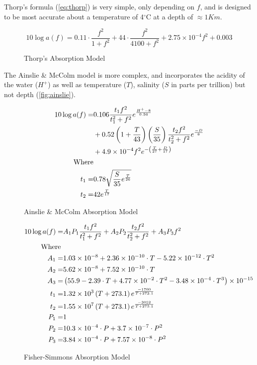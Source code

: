 Thorp's formula (\autoref{eq:thorp}) is very simple, only depending on $f$, and is designed to be most accurate about a temperature of 4$^{\circ}$C at a depth of $\approx 1Km$.
%
\begin{figure}
  \begin{equation}
    10 \log a(f) = 0.11 \cdot \frac{f^2}{1+f^2} + 44\cdot\frac{f^2}{4100+f^2}+ 2.75\times10^{-4} f^2 + 0.003
    \label{eq:thorp}
  \end{equation}
  \caption[Thorp's formula]{Thorp's Absorption Model~\cite{Stojanovic2007}}
    \label{fig:thorp}
\end{figure}
%
The Ainslie \& McColm model is more complex, and incorporates the acidity of the water ($H^+$) as well as temperature ($T$), salinity ($S$ in parts per trillion) but not depth (\autoref{fig:ainslie}).
%
\begin{figure}
  \begin{align}
    10 \log a(f) =& 0.106 \frac{t_1 f^2}{t_1^2 + f^2} e^{\frac{H^+-8}{0.56}}\\\notag
      & + 0.52 \left(1+\frac{T}{43}\right)\left(\frac{S}{35}\right)\frac{t_2f^2}{t_2^2+f^2} e^{\frac{-D}{6}}\\\notag
      & + 4.9 \times 10^{-4} f^2e^{-\left(\frac{T}{27}+\frac{D}{17}\right)}\\\notag
      \text{Where}&\\\notag
      t_1 =& 0.78 \sqrt{\frac{S}{35}e^{\frac{T}{26}}}\\\notag
      t_2 =& 42 e^{\frac{T}{17}}\notag
      \label{eq:ainslie}
  \end{align}
  \caption{Ainslie \& McColm Absorption Model}
  \label{fig:ainslie}
\end{figure}
%
\begin{figure}
  \begin{align}
    10 \log a(f)=& A_1P_1\frac{t_1f^2}{t_1^2+f^2} + A_2P_2\frac{t_2f^2}{t_2^2+f^2} + A_3P_3f^2\\\notag
    \text{Where }&\\\notag
    A_1=&1.03\times 10^{-8} + 2.36\times 10^{-10} \cdot T -5.22 \times 10^{-12}\cdot T^2\\\notag
    A_2=&5.62\times 10^{-8} + 7.52\times 10^{-10} \cdot T\\\notag
    A_3=&\left(55.9 - 2.39\cdot T + 4.77\times 10^{-2}\cdot T^2 - 3.48 \times 10^{-4}\cdot T^3\right) \times 10 ^{-15}\\\notag
    t_1=&1.32\times 10^3\left(T+273.1\right)e^{\frac{-1700}{T+273.1}}\\\notag
    t_2=&1.55\times 10^7\left(T+273.1\right)e^{\frac{-3052}{T+273.1}}\\\notag
    P_1=&1\\\notag
    P_2=&\-10.3\times 10^{-4}\cdot P + 3.7\times 10^{-7}\cdot P^2\\\notag
    P_3=&\-3.84\times 10^{-4}\cdot P + 7.57\times 10^{-8}\cdot P^2\notag
    \label{eq:fisher}
  \end{align}
  \caption{Fisher-Simmons Absorption Model}
  \label{fig:fisher}
\end{figure}

